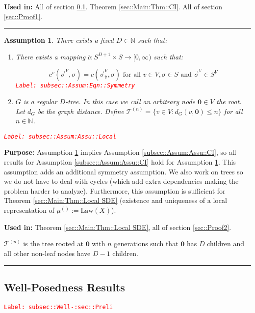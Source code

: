 \documentclass[12pt]{article}
\newcommand{\mb}{\mathbb}
\newcommand{\mc}{\mathcal}
\newcommand{\ra}{\rightarrow}
\newcommand{\ov}{\overline}
\newcommand{\te}{\text}
\newcommand{\tr}{\textcolor{red}}
\newcommand{\labe}[1]{\tr{\texttt{Label: #1}}}
\newcommand{\purpose}{\textbf{Purpose: }}
\newcommand{\usein}{\textbf{Used in: }}
\newcommand{\ind}{\hspace{24pt}}
\newcommand{\lin}{\rule{\linewidth}{0.4 pt}}
\newcommand{\defeq}{:=}								%
\renewcommand{\root}{\mathbf{0}}				%
\renewcommand{\v}{v}							%
\renewcommand{\S}{S}							%
\newcommand{\s}{\sigma}							%
\newcommand{\sv}{\vec{\s}}						%
\newcommand{\X}{X}								%
\newcommand{\IGr}{c}							%
\newcommand{\vind}[1]{^{#1}}					%
\newcommand{\carp}[1]{^{#1}}					%
\newcommand{\vsi}[1]{^{#1}}						%
\newcommand{\cind}[1]{_{#1}}					%
\newcommand{\cl}{\ov}							%
\newcommand{\tip}[1]{#1}						%
\newcommand{\ts}[1]{_{#1}}						%
\newcommand{\degr}{D}							%
\newcommand{\IGrg}{\ov{c}}						%
\newcommand{\gdist}{d_G}						%
\newcommand{\tree}{\mc{T}}						%
\newcommand{\sln}[1]{^{(#1)}}						%
\newcommand{\m}{\mu}							%
\newcommand{\law}{\te{Law}}						%
\newtheorem{assu}[thms]{Assumption}
\begin{document}
\usein All of section \ref{subsec::Well-:sec::Preli}. Theorem \ref{sec::Main:Thm::CI}. All of section \ref{sec::Proof1}.

\lin

\begin{assu}
There exists a fixed \(\degr\in \mb{N}\) such that:

\begin{enumerate}
\item There exists a mapping \(\IGrg: \S\carp{\degr+1} \times \S \ra [0,\infty)\) such that:

\begin{equation}
\IGr\vind{\v}(\sv\cind{}\vsi{V},\s) = \IGrg(\sv\cind{\cl{\v}}\vsi{V},\s) \te{ for all } \v\in V, \s\in \S\te{ and } \sv\cind{}\vsi{V} \in \S\carp{V}
\label{subsec::Assum:Eqn::Symmetry}
\end{equation}
\labe{subsec::Assum:Eqn::Symmetry}

\item \(G\) is a regular \(\degr\)-tree. In this case we call an arbitrary node \(\root\in V\) the root. Let \(\gdist\) be the graph distance. Define \(\tree\sln{n} = \{\v \in V: \gdist(\v,\root) \leq n\}\) for all \(n\in \mb{N}\).
\end{enumerate}
\label{subsec::Assum:Assu::Local}\labe{subsec::Assum:Assu::Local}
\end{assu}

\purpose Assumption \ref{subsec::Assum:Assu::Local} implies Assumption \ref{subsec::Assum:Assu::CI}, so all results for Assumption \ref{subsec::Assum:Assu::CI} hold for Assumption \ref{subsec::Assum:Assu::Local}. This assumption adds an additional symmetry assumption. We also work on trees so we do not have to deal with cycles (which add extra dependencies making the problem harder to analyze). Furthermore, this assumption is sufficient for Theorem \ref{sec::Main:Thm::Local SDE} (existence and uniqueness of a local representation of \(\m\sln{}\ts{} \defeq \law(\X\cind{}\tip{})\)).

\usein Theorem \ref{sec::Main:Thm::Local SDE}, all of section \ref{sec::Proof2}.

\ind \(\tree\sln{n}\) is the tree rooted at \(\root\) with \(n\) generations such that \(\root\) has \(\degr\) children and all other non-leaf nodes have \(\degr-1\) children.

\lin

\subsection{Well-Posedness Results}
\label{subsec::Well-:sec::Preli}\labe{subsec::Well-:sec::Preli}
\end{document}
